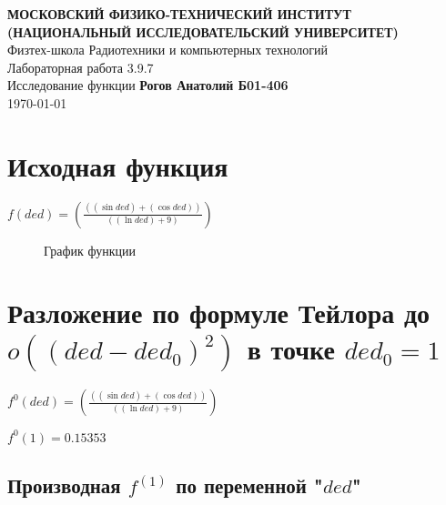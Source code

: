 \documentclass[12pt, letterpaper]{report}
\begin{document}
\begin{titlepage}
\begin{center}
\vspace*{1cm}
\textbf{МОСКОВСКИЙ ФИЗИКО-ТЕХНИЧЕСКИЙ ИНСТИТУТ (НАЦИОНАЛЬНЫЙ ИССЛЕДОВАТЕЛЬСКИЙ УНИВЕРСИТЕТ)}\\
\vspace{0.5cm} Физтех-школа Радиотехники и компьютерных технологий\\
\vspace{5cm} \LARGE{Лабораторная работа 3.9.7\\
Исследование функции}
\vfill
\large{\textbf{Рогов Анатолий Б01-406}} \\
\large \today
\vspace{0.8cm}
\end{center}
\end{titlepage}
\chapter{Исходная функция}
\hfil $f(ded) = (\frac{({(\sin{ded})}+{(\cos{ded})})}{({(\ln{ded})}+{9})})$\\
\begin{figure}[h]
\centering
{}
\caption{График функции}
\end{figure}
\chapter{Разложение по формуле Тейлора до \\ $o((ded - ded_0)^{2})$ в точке $ded_0 = 1$}
\begin{center} $f^{0}(ded) = (\frac{({(\sin{ded})}+{(\cos{ded})})}{({(\ln{ded})}+{9})})$ \end{center}
\begin{center} $f^{0}(1) = 0.15353$ \end{center}
\section{Производная $f^{(1)}$ по переменной "$ded$"}
\renewcommand{\thesubsection}{\arabic{subsection}}
\titleformat{\subsection}{\normalfont\bfseries}{}{0em}{#1\ \thesubsection}
\end{document}
